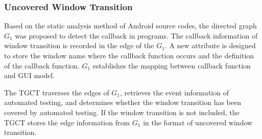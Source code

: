 

\subsubsection{Uncovered Window Transition}
Based on the static analysis method of Android source codes, the directed graph $G_{1}$ was proposed to detect the callback in programs. The callback information of window transition is recorded in the edge of the $G_{1}$. A new attribute is designed to store the window name where the callback function occurs and the definition of the callback function. $G_{1}$ establishes the mapping between callback function and GUI model.


The TGCT traverses the edges of $G_{1}$, retrieves the event information of automated testing, and determines whether the window transition has been covered by automated testing. If the window transition is not included, the TGCT stores the edge information from $G_{1}$ in the format of uncovered window transition. 

